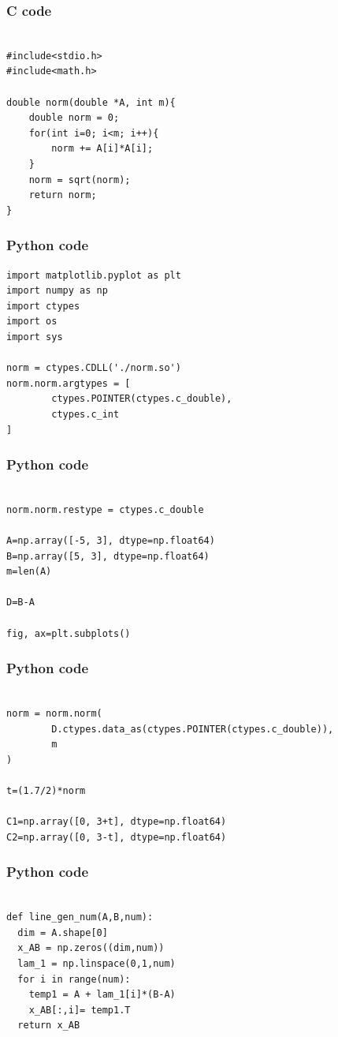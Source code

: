 \documentclass{beamer}
\begin{document}
\begin{frame}[fragile]
\frametitle{C code}
\begin{lstlisting}

#include<stdio.h>
#include<math.h>

double norm(double *A, int m){
	double norm = 0;
	for(int i=0; i<m; i++){
		norm += A[i]*A[i];
	}
	norm = sqrt(norm);
	return norm;
}

\end{lstlisting}
\end{frame}

\begin{frame}[fragile]
\frametitle{Python code}
\begin{lstlisting}
import matplotlib.pyplot as plt
import numpy as np
import ctypes
import os
import sys

norm = ctypes.CDLL('./norm.so')
norm.norm.argtypes = [
        ctypes.POINTER(ctypes.c_double),
        ctypes.c_int
]

\end{lstlisting}
\end{frame}

\begin{frame}[fragile]
\frametitle{Python code}
\begin{lstlisting}

norm.norm.restype = ctypes.c_double

A=np.array([-5, 3], dtype=np.float64)
B=np.array([5, 3], dtype=np.float64)
m=len(A)

D=B-A

fig, ax=plt.subplots()

\end{lstlisting}
\end{frame}

\begin{frame}[fragile]
\frametitle{Python code}
\begin{lstlisting}

norm = norm.norm(
        D.ctypes.data_as(ctypes.POINTER(ctypes.c_double)),
        m
)

t=(1.7/2)*norm

C1=np.array([0, 3+t], dtype=np.float64)
C2=np.array([0, 3-t], dtype=np.float64)

\end{lstlisting}
\end{frame}

\begin{frame}[fragile]
\frametitle{Python code}
\begin{lstlisting}

def line_gen_num(A,B,num):
  dim = A.shape[0]
  x_AB = np.zeros((dim,num))
  lam_1 = np.linspace(0,1,num)
  for i in range(num):
    temp1 = A + lam_1[i]*(B-A)
    x_AB[:,i]= temp1.T
  return x_AB

\end{lstlisting}
\end{frame}
\end{document}
